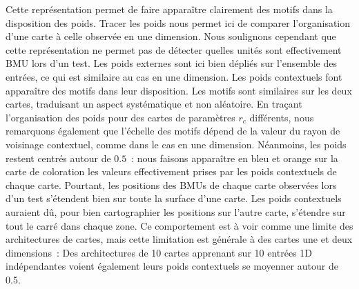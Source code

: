 \documentclass[../main]{subfiles}
\begin{document}
Cette représentation permet de faire apparaître clairement des motifs dans la disposition des poids.
Tracer les poids nous permet ici de comparer l'organisation d'une carte à celle observée en une dimension. Nous soulignons cependant que cette représentation ne permet pas de détecter quelles unités sont effectivement BMU lors d'un test.
Les poids externes sont ici bien dépliés sur l'ensemble des entrées, ce qui est similaire au cas en une dimension.
Les poids contextuels font apparaître des motifs dans leur disposition. 
Les motifs sont similaires sur les deux cartes, traduisant un aspect systématique et non aléatoire.
En traçant l'organisation des poids pour des cartes de paramètres $r_c$ différents, nous remarquons également que l'échelle des motifs dépend de la valeur du rayon de voisinage contextuel, comme dans le cas en une dimension.
Néanmoins, les poids restent centrés autour de $0.5$~: nous faisons apparaître en bleu et orange sur la carte de coloration les valeurs effectivement prises par les poids contextuels de chaque carte. 
Pourtant, les positions des BMUs de chaque carte observées lors d'un test s'étendent bien sur toute la surface d'une carte. Les poids contextuels auraient dû, pour bien cartographier les positions sur l'autre carte, s'étendre sur tout le carré dans chaque zone.
Ce comportement est à voir comme une limite des architectures de cartes, mais cette limitation est générale à des cartes une et deux dimensions~:  Des architectures de 10 cartes apprenant sur 10 entrées 1D indépendantes voient également leurs poids contextuels se moyenner autour de 0.5.
\end{document}
